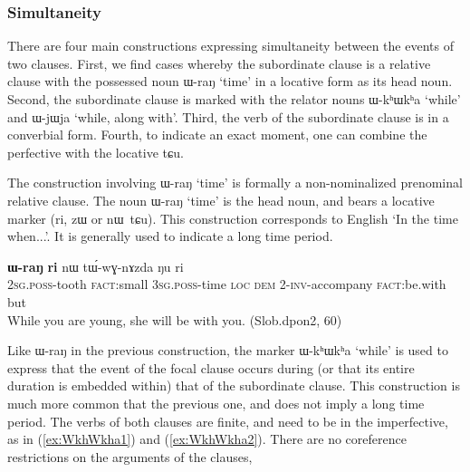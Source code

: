 \documentclass[oldfontcommands,oneside,a4paper,11pt]{article}
\newcommand{\ipa}[1]{{\phon \mbox{#1}}} %
\newcommand{\refb}[1]{(\ref{#1})}
\begin{document}
	

 

\subsubsection{Simultaneity} \label{sec:simultaneity}

There are four main constructions  expressing simultaneity between the events of two clauses. First, we find cases whereby the subordinate clause is a relative clause with the possessed noun \ipa{ɯ-raŋ} `time' in a locative form as its head noun. Second, the subordinate clause is marked with  the relator nouns \ipa{ɯ-kʰɯkʰa} `while' and \ipa{ɯ-jɯja} `while, along with'.  Third, the verb of the subordinate clause is in a converbial form. Fourth, to indicate an  exact moment, one can combine the perfective with the locative \ipa{tɕu}.


The construction involving \ipa{ɯ-raŋ} `time' is formally a non-nominalized prenominal relative clause.  The noun  \ipa{ɯ-raŋ} `time' is the head noun, and bears  a locative marker (\ipa{ri}, \ipa{zɯ} or \ipa{nɯ tɕu}). This construction corresponds to English `In the time when...'. It is generally used to indicate a long time period.

\begin{exe}
   \ex \label{ex:WraN2}
 \gll [\ipa{nɤ-ɕɣa}   	\ipa{xtɕi}]   	\textbf{\ipa{ɯ-raŋ}}   	\textbf{\ipa{ri}}   	\ipa{nɯ}   	\ipa{tɯ́-wɣ-nɤzda}   	\ipa{ŋu}   	\ipa{ri}   \\
 \textsc{2sg.poss}-tooth \textsc{fact}:small \textsc{3sg.poss}-time \textsc{loc} \textsc{dem} 2-\textsc{inv}-accompany \textsc{fact}:be.with but \\
\glt While you are young, she will be with you. (Slob.dpon2, 60)
\end{exe}

Like \ipa{ɯ-raŋ} in the previous construction, the marker  \ipa{ɯ-kʰɯkʰa} `while'  is used to express  that the event of the focal clause occurs during (or that its entire duration is embedded within) that of the subordinate clause. This construction is much more common that the previous one, and does not imply a long time period.  The verbs of both clauses are finite, and need to be in the imperfective, as in \refb{ex:WkhWkha1} and \refb{ex:WkhWkha2}. There are no coreference restrictions on the arguments of the clauses, 
\end{document}

